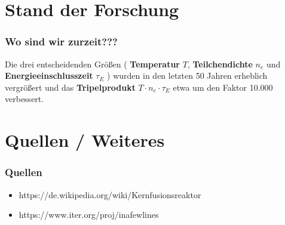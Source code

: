 \documentclass[aspectratio=169]{beamer}
\begin{document}

  \section{Stand der Forschung}

    \begin{frame}
      \frametitle{Wo sind wir zurzeit???}

      Die drei entscheidenden Größen ( \textbf{Temperatur} \( T \), \textbf{Teilchendichte} \( n_e \)
      und \textbf{Energieeinschlusszeit} \( \tau_E \) ) wurden in den letzten 50 Jahren
      erheblich vergrößert und das \textbf{Tripelprodukt} \( T \cdot n_e \cdot \tau_E \)
      etwa um den Faktor 10.000 verbessert.

    \end{frame}

  \section{Quellen / Weiteres}

    \begin{frame}
      \frametitle{Quellen}
      \begin{itemize}
        \item https://de.wikipedia.org/wiki/Kernfusionsreaktor
        \item https://www.iter.org/proj/inafewlines
      \end{itemize}
    \end{frame}
\end{document}
